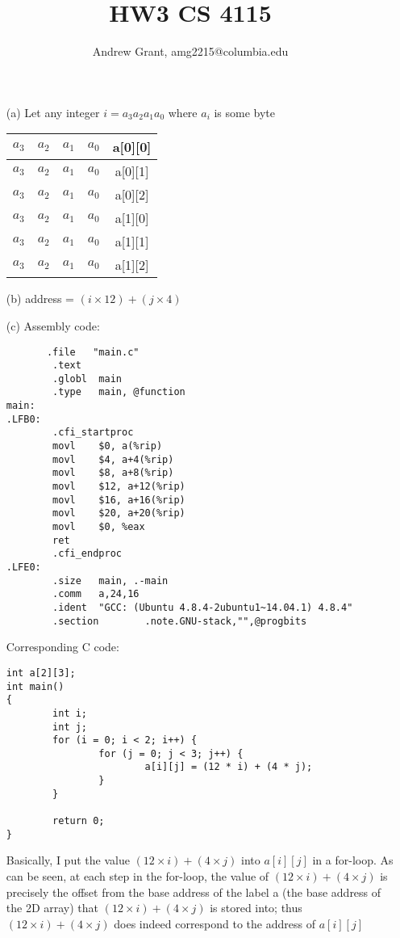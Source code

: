 \documentclass{article}[10pt]
\title{HW3 CS 4115}
\author{Andrew Grant, amg2215@columbia.edu}
\date{}
\begin{document}
\maketitle


\section{}
\begin{enumerate}
\item[(a)] Let any integer $i = a_3 a_2 a_1 a_0$ where $a_i$ is some byte \\
  \begin{tabular}{| c | c  | c | c | |   c | }
    \hline
    $a_3$ & $a_2$ & $a_1$ & $a_0$ & a[0][0]  \\  \hline
    $a_3$ & $a_2$ & $a_1$ & $a_0$ & a[0][1]  \\  \hline
     $a_3$ & $a_2$ & $a_1$ & $a_0$ & a[0][2]  \\  \hline
     $a_3$ & $a_2$ & $a_1$ & $a_0$ & a[1][0]  \\  \hline
     $a_3$ & $a_2$ & $a_1$ & $a_0$ & a[1][1]  \\  \hline
     $a_3$ & $a_2$ & $a_1$ & $a_0$ & a[1][2]  \\  \hline
\end{tabular}
  
\item[(b)]
address = $(i \times 12) + (j \times 4)$

\item[(c)]
Assembly code: \\
\begin{lstlisting}
       .file   "main.c"
        .text
        .globl  main
        .type   main, @function
main:
.LFB0:
        .cfi_startproc
        movl    $0, a(%rip)
        movl    $4, a+4(%rip)
        movl    $8, a+8(%rip)
        movl    $12, a+12(%rip)
        movl    $16, a+16(%rip)
        movl    $20, a+20(%rip)
        movl    $0, %eax
        ret
        .cfi_endproc
.LFE0:
        .size   main, .-main
        .comm   a,24,16
        .ident  "GCC: (Ubuntu 4.8.4-2ubuntu1~14.04.1) 4.8.4"
        .section        .note.GNU-stack,"",@progbits
\end{lstlisting}
Corresponding C code: \\
\begin{lstlisting}
int a[2][3];
int main()
{       
        int i;  
        int j;
        for (i = 0; i < 2; i++) {
                for (j = 0; j < 3; j++) {
                        a[i][j] = (12 * i) + (4 * j);
                }
        }
        
        return 0;
}
\end{lstlisting}
Basically, I put the value $(12 \times i) + (4 \times j)$ into $a[i][j]$ in a for-loop. As can be seen, at each step in the for-loop, the value of $(12 \times i) + (4 \times j)$ is precisely the offset from the base address of the label a (the base address of the 2D array) that $(12 \times i) + (4 \times j)$ is stored into; thus $(12 \times i) + (4 \times j)$ does indeed correspond to the address of $a[i][j]$ 
  
\end{enumerate}
\end{document}
